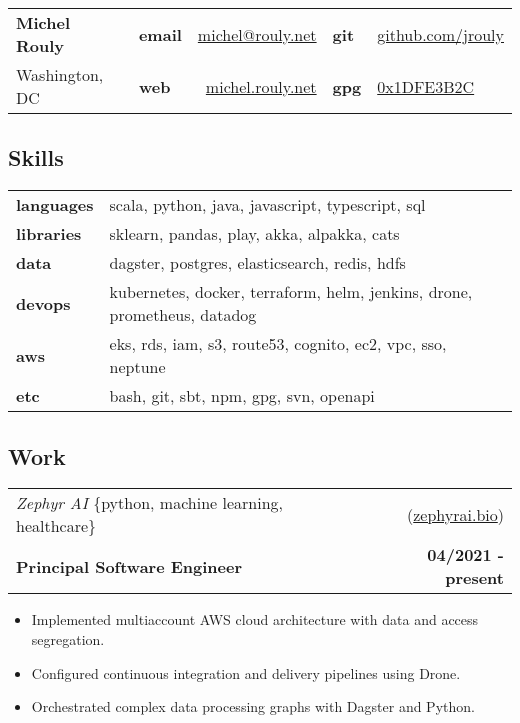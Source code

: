 \documentclass[10pt,letterpaper]{article}
\begin{document}
\setcounter{secnumdepth}{0}

\noindent
\begin{tabularx}{\textwidth}{@{} l X lr lX @{}}
  {\Large\textbf{Michel Rouly}} & &
      \textbf{email} & \href{mailto:michel@rouly.net}{michel@rouly.net} &
      \textbf{git} & \href{https://github.com/jrouly}{github.com/jrouly} \\
  {Washington, DC} & &
      \textbf{web} & \href{https://michel.rouly.net}{michel.rouly.net} &
      \textbf{gpg} & \href{https://keyserver.ubuntu.com/pks/lookup?search=0x1DFE3B2C\&fingerprint=on\&op=index}{0x1DFE3B2C} \\
\end{tabularx}

\subsection{Skills}

\noindent
\begin{tabularx}{\textwidth}{@{} lX @{}}
  \textbf{languages} & scala, python, java, javascript, typescript, sql \\
  \textbf{libraries} & sklearn, pandas, play, akka, alpakka, cats \\
  \textbf{data} & dagster, postgres, elasticsearch, redis, hdfs \\
  \textbf{devops} & kubernetes, docker, terraform, helm, jenkins, drone, prometheus, datadog \\
  \textbf{aws} & eks, rds, iam, s3, route53, cognito, ec2, vpc, sso, neptune \\
  \textbf{etc} & bash, git, sbt, npm, gpg, svn, openapi
\end{tabularx}

\subsection{Work}

\noindent\begin{tabularx}{\textwidth}{@{} Xr @{}}
  \textit{Zephyr AI} \{python, machine learning, healthcare\} & (\href{https://zephyrai.bio}{zephyrai.bio}) \\
  \textbf{Principal Software Engineer} & \textbf{04/2021 - present} \\
\end{tabularx}

\begin{itemize}
\item Implemented multiaccount AWS cloud architecture with data and access segregation.
\item Configured continuous integration and delivery pipelines using Drone.
\item Orchestrated complex data processing graphs with Dagster and Python.
\end{itemize}
\end{document}

